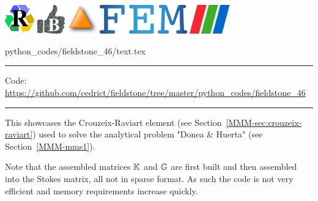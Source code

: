 \includegraphics[height=1.25cm]{images/pictograms/replication}
\includegraphics[height=1.25cm]{images/pictograms/benchmark}
\includegraphics[height=1.25cm]{images/pictograms/triangle}
\includegraphics[height=1.25cm]{images/pictograms/FEM}
\includegraphics[height=1.25cm]{images/pictograms/paraview}


\begin{flushright} {\tiny {\color{gray} python\_codes/fieldstone\_46/text.tex}} \end{flushright}

%

\par\noindent\rule{\textwidth}{0.4pt}

\begin{center}
\inpython
{\small Code: \url{https://github.com/cedrict/fieldstone/tree/master/python_codes/fieldstone_46}}
\end{center}

\par\noindent\rule{\textwidth}{0.4pt}

This \stone showcases the Crouzeix-Raviart element (see Section~\ref{MMM-sec:crouzeix-raviart})
used to solve the analytical problem "Donea \& Huerta" (see Section~\ref{MMM-mms1}).

Note that the assembled matrices ${\mathbb{K}}$ and ${\mathbb{G}}$ are first built and then assembled
into the Stokes matrix, all not in sparse format. As such the code is not very efficient 
and memory requirements increase quickly. 

